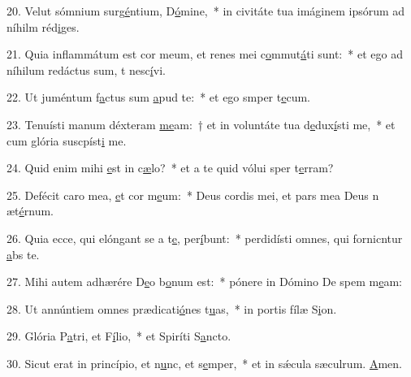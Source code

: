 20. Velut sómnium surg\uline{é}ntium, D\uline{ó}mine,~* in civitáte tua imáginem ipsórum ad níhilm réd\uline{i}ges.\par 
21. Quia inflammátum est cor meum, et renes mei c\uline{o}mmut\uline{á}ti sunt:~* et ego ad níhilum redáctus sum, t nesc\uline{í}vi.\par 
22. Ut juméntum f\uline{a}ctus sum \uline{a}pud te:~* et ego smper t\uline{e}cum.\par 
23. Tenuísti manum déxteram \uline{me}am:~† et in voluntáte tua d\uline{e}dux\uline{í}sti me,~* et cum glória suscpíst\uline{i} me.\par 
24. Quid enim mihi \uline{e}st in c\uline{æ}lo?~* et a te quid vólui sper t\uline{e}rram?\par 
25. Defécit caro mea, \uline{e}t cor m\uline{e}um:~* Deus cordis mei, et pars mea Deus n æt\uline{é}rnum.\par 
26. Quia ecce, qui elóngant se a t\uline{e}, per\uline{í}bunt:~* perdidísti omnes, qui fornicntur \uline{a}bs te.\par 
27. Mihi autem adhærére D\uline{e}o b\uline{o}num est:~* pónere in Dómino De spem m\uline{e}am:\par 
28. Ut annúntiem omnes prædicati\uline{ó}nes t\uline{u}as,~* in portis fílæ S\uline{i}on.\par 
29. Glória P\uline{a}tri, et F\uline{í}lio,~* et Spiríti S\uline{a}ncto.\par 
30. Sicut erat in princípio, et n\uline{u}nc, et s\uline{e}mper,~* et in sǽcula sæculrum. \uline{A}men.\par 
